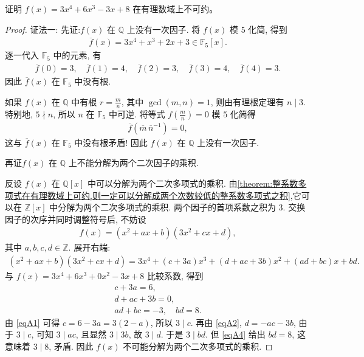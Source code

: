 \documentclass[../../main.tex]{subfiles}%
\begin{document}
\begin{example}
证明 \( f(x) = 3x^{4} + 6x^{3} - 3x + 8 \) 在有理数域上不可约。
\end{example}
\begin{proof}

{\color{blue}证法一:}
先证:\( f(x) \) 在 \( \mathbb{Q} \) 上没有一次因子.
将 \( f(x) \) 模 \(5\) 化简, 得到
\begin{align*}
\overline{f}(x) = 3x^{4} + x^{3} + 2x + 3 \in \mathbb{F}_{5}[x].
\end{align*}
逐一代入 \( \mathbb{F}_{5} \) 中的元素, 有
\begin{align*}
\overline{f}(0)=3,\quad \overline{f}(1)=4,\quad \overline{f}(2)=3,\quad \overline{f}(3)=4,\quad \overline{f}(4)=3.
\end{align*}
因此 \( \overline{f}(x) \) 在 \( \mathbb{F}_{5} \) 中没有根.

如果 \( f(x) \) 在 \( \mathbb{Q} \) 中有根 \( r = \frac{m}{n} \), 其中 \( \gcd(m,n)=1 \), 则由有理根定理有 \( n \mid 3 \). 特别地, \( 5 \nmid n \), 所以 \( n \) 在 \( \mathbb{F}_{5} \) 中可逆. 将等式 \( f(\frac{m}{n})=0 \) 模 \(5\) 化简得
\begin{align*}
\overline{f}(\overline{m}\,\overline{n}^{-1}) = 0,
\end{align*}
这与 \( \overline{f}(x) \) 在 \( \mathbb{F}_{5} \) 中没有根矛盾! 因此 \( f(x) \) 在 \( \mathbb{Q} \) 上没有一次因子.

再证\( f(x) \) 在 \( \mathbb{Q} \) 上不能分解为两个二次因子的乘积.

反设 \( f(x) \) 在 \( \mathbb{Q}[x] \) 中可以分解为两个二次多项式的乘积. 由\cref{theorem:整系数多项式在有理数域上可约,则一定可以分解成两个次数较低的整系数多项式之积},它可以在 \( \mathbb{Z}[x] \) 中分解为两个二次多项式的乘积. 两个因子的首项系数之积为 \(3\). 交换因子的次序并同时调整符号后, 不妨设
\begin{align*}
f(x) = (x^{2} + ax + b)(3x^{2} + cx + d),
\end{align*}
其中 \( a,b,c,d \in \mathbb{Z} \). 展开右端:
\begin{align*}
(x^{2} + ax + b)(3x^{2} + cx + d) = 3x^{4} + (c + 3a)x^{3} + (d + ac + 3b)x^{2} + (ad + bc)x + bd.
\end{align*}
与 \( f(x) = 3x^{4} + 6x^{3} + 0x^{2} - 3x + 8 \) 比较系数, 得到
\begin{gather}
c + 3a = 6, \label{eqA1} \\
d + ac + 3b = 0, \label{eqA2} \\
ad + bc = -3,  \quad
bd = 8. \label{eqA4}
\end{gather}
由 \eqref{eqA1} 可得 \( c = 6 - 3a = 3(2-a) \), 所以 \( 3 \mid c \). 再由 \eqref{eqA2}, \( d = -ac - 3b \), 由于 \( 3 \mid c \), 可知 \( 3 \mid ac \), 且显然 \( 3 \mid 3b \), 故 \( 3 \mid d \). 于是 \( 3 \mid bd \). 但 \eqref{eqA4} 给出 \( bd = 8 \), 这意味着 \( 3 \mid 8 \), 矛盾. 因此 \( f(x) \) 不可能分解为两个二次多项式的乘积.


\end{proof}
\end{document}
